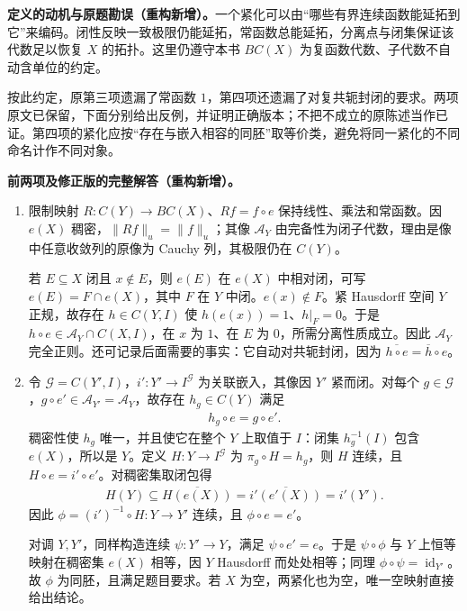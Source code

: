 \documentclass[../../main.tex]{subfiles}
\begin{document}
\begin{remark}
\textbf{定义的动机与原题勘误（重构新增）。}一个紧化可以由“哪些有界连续函数能延拓到它”来编码。闭性反映一致极限仍能延拓，常函数总能延拓，分离点与闭集保证该代数足以恢复 $X$ 的拓扑。这里仍遵守本书 $BC(X)$ 为复函数代数、子代数不自动含单位的约定。

按此约定，原第三项遗漏了常函数 $1$，第四项还遗漏了对复共轭封闭的要求。两项原文已保留，下面分别给出反例，并证明正确版本；不把不成立的原陈述当作已证。第四项的紧化应按“存在与嵌入相容的同胚”取等价类，避免将同一紧化的不同命名计作不同对象。
\end{remark}
\begin{solution}
\textbf{前两项及修正版的完整解答（重构新增）。}
\begin{enumerate}
\item 限制映射 $R:C(Y)\to BC(X)$、$Rf=f\circ e$ 保持线性、乘法和常函数。因 $e(X)$ 稠密，$\|Rf\|_u=\|f\|_u$；其像 $\mathcal A_Y$ 由完备性为闭子代数，理由是像中任意收敛列的原像为 Cauchy 列，其极限仍在 $C(Y)$。

若 $E\subseteq X$ 闭且 $x\notin E$，则 $e(E)$ 在 $e(X)$ 中相对闭，可写 $e(E)=F\cap e(X)$，其中 $F$ 在 $Y$ 中闭。$e(x)\notin F$。紧 Hausdorff 空间 $Y$ 正规，故存在 $h\in C(Y,I)$ 使 $h(e(x))=1$、$h|_F=0$。于是 $h\circ e\in\mathcal A_Y\cap C(X,I)$，在 $x$ 为 $1$、在 $E$ 为 $0$，所需分离性质成立。因此 $\mathcal A_Y$ 完全正则。还可记录后面需要的事实：它自动对共轭封闭，因为 $\overline{h\circ e}=\overline h\circ e$。

\item 令 $\mathcal G=C(Y',I)$，$i':Y'\to I^{\mathcal G}$ 为关联嵌入，其像因 $Y'$ 紧而闭。对每个 $g\in\mathcal G$，$g\circ e'\in\mathcal A_{Y'}=\mathcal A_Y$，故存在 $h_g\in C(Y)$ 满足
\begin{align*}
h_g\circ e=g\circ e'.
\end{align*}
稠密性使 $h_g$ 唯一，并且使它在整个 $Y$ 上取值于 $I$：闭集 $h_g^{-1}(I)$ 包含 $e(X)$，所以是 $Y$。定义 $H:Y\to I^{\mathcal G}$ 为 $\pi_g\circ H=h_g$，则 $H$ 连续，且 $H\circ e=i'\circ e'$。对稠密集取闭包得
\begin{align*}
H(Y)\subseteq\overline{H(e(X))}
=\overline{i'(e'(X))}=i'(Y').
\end{align*}
因此 $\phi=(i')^{-1}\circ H:Y\to Y'$ 连续，且 $\phi\circ e=e'$。

对调 $Y,Y'$，同样构造连续 $\psi:Y'\to Y$，满足 $\psi\circ e'=e$。于是 $\psi\circ\phi$ 与 $Y$ 上恒等映射在稠密集 $e(X)$ 相等，因 $Y$ Hausdorff 而处处相等；同理 $\phi\circ\psi=\operatorname{id}_{Y'}$。故 $\phi$ 为同胚，且满足题目要求。若 $X$ 为空，两紧化也为空，唯一空映射直接给出结论。


\end{enumerate}
\end{solution}
\end{document}

